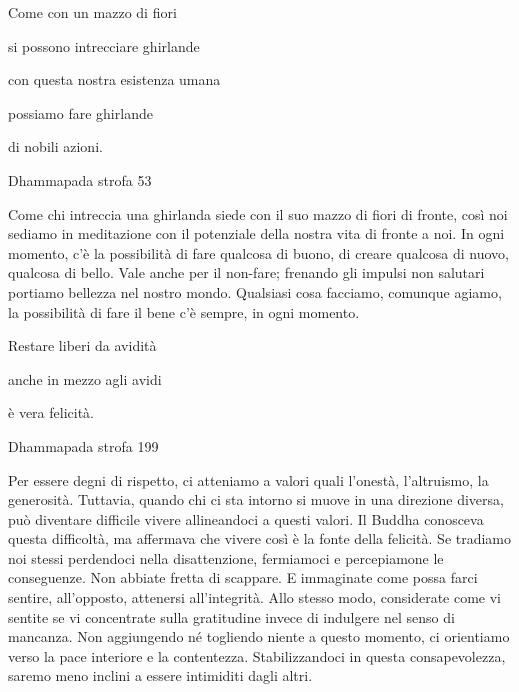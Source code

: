 \documentclass[a4paper,portrait,12pt]{article}
\begin{document}
\newpage



Come con un mazzo di fiori


si possono intrecciare ghirlande


con questa nostra esistenza umana


possiamo fare ghirlande


di nobili azioni.	





Dhammapada strofa 53


\newpage



Come chi intreccia una ghirlanda siede con il suo mazzo di fiori di fronte, così noi sediamo in meditazione con il potenziale della nostra vita di fronte a noi. In ogni momento, c'\`{e} la possibilit\`{a} di fare qualcosa di buono, di creare qualcosa di nuovo, qualcosa di bello. Vale anche per il non-fare; frenando gli impulsi non salutari portiamo bellezza nel nostro mondo. Qualsiasi cosa facciamo, comunque agiamo, la possibilit\`{a} di fare il bene c'\`{e} sempre, in ogni momento. 


\newpage



Restare liberi da avidit\`{a}


anche in mezzo agli avidi 


\`{e} vera felicit\`{a}.





Dhammapada strofa 199


\newpage



Per essere degni di rispetto, ci atteniamo a valori quali l'onest\`{a}, l'altruismo, la generosit\`{a}. Tuttavia, quando chi ci sta intorno si muove in una direzione diversa, pu\`{o} diventare difficile vivere allineandoci a questi valori. Il Buddha conosceva questa difficolt\`{a}, ma affermava che vivere così \`{e} la fonte della felicit\`{a}. Se tradiamo noi stessi perdendoci nella disattenzione, fermiamoci e percepiamone le conseguenze. Non abbiate fretta di scappare. E immaginate come possa farci sentire, all'opposto, attenersi all'integrit\`{a}. Allo stesso modo, considerate come vi sentite se vi concentrate sulla gratitudine invece di indulgere nel senso di mancanza. Non aggiungendo n\'{e} togliendo niente a questo momento, ci orientiamo verso la pace interiore e la contentezza. Stabilizzandoci in questa consapevolezza, saremo meno inclini a essere intimiditi dagli altri. 
\end{document}
